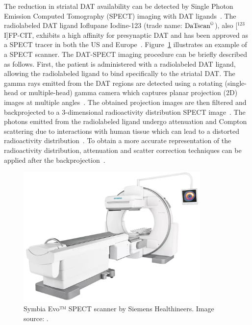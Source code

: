 The reduction in striatal DAT availability can be detected by Single Photon Emission Computed Tomography (SPECT) 
imaging with DAT ligands~\citep{Kuikka1995, Abi-Dargham1996}.
The radiolabeled DAT ligand Ioflupane Iodine-123 (trade name: $\text{DaTscan}^{\copyright}$), also [$^{123}$I]FP-CIT, 
exhibits a high affinity for presynaptic DAT and 
has been approved as a SPECT tracer in both the US and Europe~\citep{Neumeyer1994}.
Figure~\ref{fig:siemens-healthineers_MI_symbia-evo} illustrates an example of a SPECT scanner.
The DAT-SPECT imaging procedure can be briefly described as follows.
First, the patient is administered with a radiolabeled DAT ligand,
allowing the radiolabeled ligand to bind specifically to the striatal DAT.
The gamma rays emitted from the DAT regions are detected using a rotating (single-head or multiple-head) gamma camera
which captures planar projection (2D) images at multiple angles~\citep{Patton2008-xl}.
The obtained projection images are then filtered and 
backprojected to a 3-dimensional radioactivity distribution SPECT image~\citep{Patton2008-xl}.
The photons emitted from the radiolabeled ligand undergo attenuation and Compton scattering
due to interactions with human tissue which can lead to a distorted radioactivity distribution~\citep{Patton2008-xl}.
To obtain a more accurate representation of the radioactivity distribution, 
attenuation and scatter correction techniques can be applied after the backprojection~\citep{Patton2008-xl}.

\begin{figure}[ht]
  \centering
  \includegraphics[width=0.85\textwidth]{content/figures/siemens-healthineers_MI_symbia-evo.png}
  \caption{Symbia Evo™ SPECT scanner by Siemens Healthineers. Image source: \cite{SymbiaEvo_siemens}.} 
  \label{fig:siemens-healthineers_MI_symbia-evo}
\end{figure}

